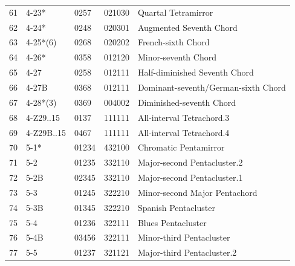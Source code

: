 \documentclass[
	12pt,				%
	openright,			%
	twoside,			%
	a4paper,			%
	english,			%
	french,				%
	spanish,			%
	brazil				%
	]{abntex2}
\begin{document}
\begin{anexosenv}
\begin{table}[h]
\begin{tabular}{lllll}
61 & 4-23*                          & 0257  & 021030          & Quartal Tetramirror                               \\
62 & 4-24*                          & 0248  & 020301          & Augmented Seventh Chord                           \\
63 & 4-25*(6)                       & 0268  & 020202          & French-sixth Chord                                \\
64 & 4-26*                          & 0358  & 012120          & Minor-seventh Chord                               \\
65 & 4-27                           & 0258  & 012111          & Half-diminished Seventh Chord                     \\
66 & 4-27B                          & 0368  & 012111          & Dominant-seventh/German-sixth Chord               \\
67 & 4-28*(3)                       & 0369  & 004002          & Diminished-seventh Chord                          \\
68 & 4-Z29..15                      & 0137  & 111111          & All-interval Tetrachord.3                         \\
69 & 4-Z29B..15                     & 0467  & 111111          & All-interval Tetrachord.4                         \\
70 & 5-1*                           & 01234 & 432100          & Chromatic Pentamirror                             \\
71 & 5-2                            & 01235 & 332110          & Major-second Pentacluster.2                       \\
72 & 5-2B                           & 02345 & 332110          & Major-second Pentacluster.1                       \\
73 & 5-3                            & 01245 & 322210          & Minor-second Major Pentachord                     \\
74 & 5-3B                           & 01345 & 322210          & Spanish Pentacluster                              \\
75 & 5-4                            & 01236 & 322111          & Blues Pentacluster                                \\
76 & 5-4B                           & 03456 & 322111          & Minor-third Pentacluster                          \\
77 & 5-5                            & 01237 & 321121          & Major-third Pentacluster.2                        \\

\end{tabular}
\end{table}
\end{anexosenv}
\end{document}
